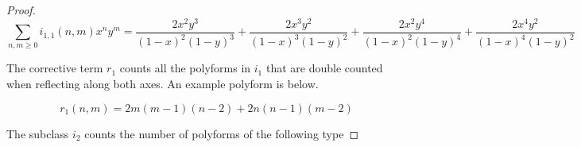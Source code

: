 \documentclass[12pt]{article}
\theoremstyle{plain}
\theoremstyle{definition}
\theoremstyle{remark}
\theoremstyle{definition}
\newcommand{\cellw}[4]{\draw[thick] ( #1 , #2 ) rectangle ( #3 , #4 );}
\newcommand{\cellb}[4]{\filldraw[black!60] ( #1 , #2 ) rectangle ( #3 , #4 ); \draw[thick] ( #1 , #2 ) rectangle ( #3 , #4 );}
\begin{document}
\begin{proof}
\begin{equation*}
    \sum_{n,m \geq 0} i_{1,1}(n,m)x^n y^m = \frac{2 x^2 y^3}{(1-x)^2 (1-y)^3} + \frac{2 x^3 y^2}{(1-x)^3 (1-y)^2 } + \frac{2x^2 y^4}{(1-x)^2 (1-y)^4} + \frac{2x^4 y^2}{(1-x)^4 (1-y)^2}
\end{equation*}

The corrective term $r_1$ counts all the polyforms in $i_1$ that are double counted when reflecting along both axes. An example polyform is below.

\begin{center}
\end{center}

\begin{equation*}
    r_1(n,m) = 2m(m-1)(n-2)+ 2n(n-1)(m-2)
\end{equation*}

The subclass $i_2$ counts the number of polyforms of the following type


\end{proof}
\end{document}
